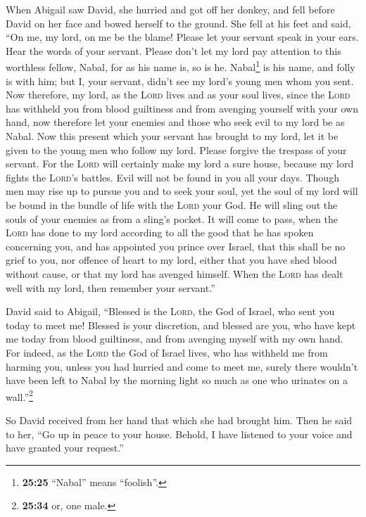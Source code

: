 When Abigail saw David, she hurried and got off her
donkey, and fell before David on her face and bowed herself to the
ground.  She fell at his feet and said, ``On me, my lord,
on me be the blame! Please let your servant speak in your ears. Hear the
words of your servant.  Please don't let my lord pay
attention to this worthless fellow, Nabal, for as his name is, so is he.
Nabal\footnote{\textbf{25:25} ``Nabal'' means ``foolish''.} is his name,
and folly is with him; but I, your servant, didn't see my lord's young
men whom you sent.  Now therefore, my lord, as the
\textsc{Lord} lives and as your soul lives, since the \textsc{Lord} has
withheld you from blood guiltiness and from avenging yourself with your
own hand, now therefore let your enemies and those who seek evil to my
lord be as Nabal.  Now this present which your servant
has brought to my lord, let it be given to the young men who follow my
lord.  Please forgive the trespass of your servant. For
the \textsc{Lord} will certainly make my lord a sure house, because my
lord fights the \textsc{Lord}'s battles. Evil will not be found in you
all your days.  Though men may rise up to pursue you and
to seek your soul, yet the soul of my lord will be bound in the bundle
of life with the \textsc{Lord} your God. He will sling out the souls of
your enemies as from a sling's pocket.  It will come to
pass, when the \textsc{Lord} has done to my lord according to all the
good that he has spoken concerning you, and has appointed you prince
over Israel,  that this shall be no grief to you, nor
offence of heart to my lord, either that you have shed blood without
cause, or that my lord has avenged himself. When the \textsc{Lord} has
dealt well with my lord, then remember your servant.''

 David said to Abigail, ``Blessed is the \textsc{Lord},
the God of Israel, who sent you today to meet me! 
Blessed is your discretion, and blessed are you, who have kept me today
from blood guiltiness, and from avenging myself with my own hand.
 For indeed, as the \textsc{Lord} the God of Israel
lives, who has withheld me from harming you, unless you had hurried and
come to meet me, surely there wouldn't have been left to Nabal by the
morning light so much as one who urinates on a wall.''\footnote{\textbf{25:34}
  or, one male.}

 So David received from her hand that which she had
brought him. Then he said to her, ``Go up in peace to your house.
Behold, I have listened to your voice and have granted your request.''


